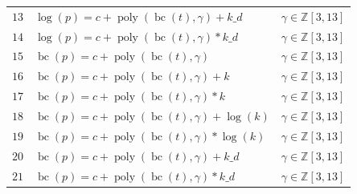 \documentclass[12pt,a4paper]{article}
\DeclareMathOperator{\bc}{bc}
\DeclareMathOperator{\poly}{poly}
\begin{document}
\begin{table}
\begin{tabular}{rlc}
        $13$ & $\log(p) = c + \poly\left( \bc(t), \gamma \right) + k\_d $ & $\gamma \in \mathbb{Z} \left[3, 13 \right]$\\
        $14$ & $\log(p) = c + \poly\left( \bc(t), \gamma \right) * k\_d $ & $\gamma \in \mathbb{Z} \left[3, 13 \right]$\\   
        \midrule
        $15$ & $\bc(p) = c + \poly\left( \bc(t), \gamma \right) $ & $\gamma \in \mathbb{Z} \left[3, 13 \right]$\\ 
        $16$ & $\bc(p) = c + \poly\left( \bc(t), \gamma \right) + k $ & $\gamma \in \mathbb{Z} \left[3, 13 \right]$\\
        $17$ & $\bc(p) = c + \poly\left( \bc(t), \gamma \right) * k $ & $\gamma \in \mathbb{Z} \left[3, 13 \right]$\\
        $18$ & $\bc(p) = c + \poly\left( \bc(t), \gamma \right) + \log(k) $ & $\gamma \in \mathbb{Z} \left[3, 13 \right]$\\
        $19$ & $\bc(p) = c + \poly\left( \bc(t), \gamma \right) * \log(k) $ & $\gamma \in \mathbb{Z} \left[3, 13 \right]$\\
        $20$ & $\bc(p) = c + \poly\left( \bc(t), \gamma \right) + k\_d $ & $\gamma \in \mathbb{Z} \left[3, 13 \right]$\\
        $21$ & $\bc(p) = c + \poly\left( \bc(t), \gamma \right) * k\_d $ & $\gamma \in \mathbb{Z} \left[3, 13 \right]$\\    
        \bottomrule
    \end{tabular}
\end{table}
\end{document}
